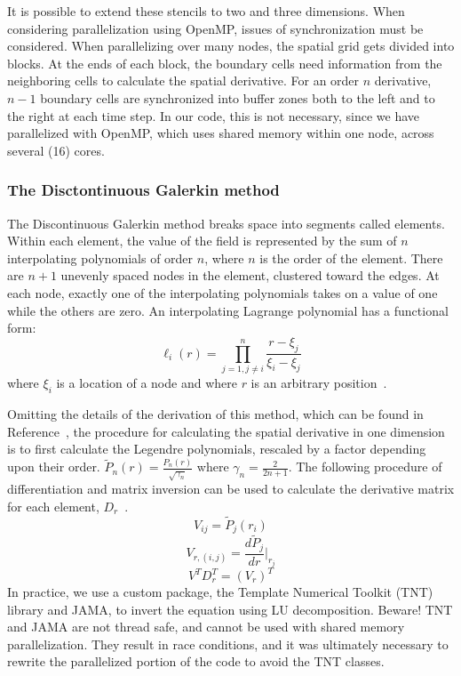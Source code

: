 It is possible to extend these stencils to two and three dimensions. When considering parallelization using OpenMP, issues of synchronization must be considered. When parallelizing over many nodes, the spatial grid gets divided into blocks. At the ends of each block, the boundary cells need information from the neighboring cells to calculate the spatial derivative. For an order $n$ derivative, $n-1$ boundary cells are synchronized into buffer zones both to the left and to the right at each time step. In our code, this is not necessary, since we have parallelized with OpenMP, which uses shared memory within one node, across several (16) cores.

\subsubsection{The Disctontinuous Galerkin method}
The Discontinuous Galerkin method breaks space into segments called elements. Within each element, the value of the field is represented by the sum of $n$ interpolating polynomials of order $n$, where $n$ is the order of the element. There are $n+1$ unevenly spaced nodes in the element, clustered toward the edges. At each node, exactly one of the interpolating polynomials takes on a value of one while the others are zero. An interpolating Lagrange polynomial has a functional form:
\begin{equation}
  \ell_i(r)=\prod_{j=1,j\ne i}^{n}\frac{r-\xi_j}{\xi_i-\xi_j}
\end{equation}
where $\xi_i$ is a location of a node and where $r$ is an arbitrary position~\cite{dghesthaven}. 


Omitting the details of the derivation of this method, which can be found in Reference~\cite{dghesthaven}, the procedure for calculating the spatial derivative in one dimension is to first calculate the Legendre polynomials, rescaled by a factor depending upon their order. $\tilde{P}_n(r)=\frac{P_n(r)}{\sqrt{\gamma_n}}$ where $\gamma_n=\frac{2}{2n+1}$. The following procedure of differentiation and matrix inversion can be used to calculate the derivative matrix for each element, $D_r$~\cite{dghesthaven}.
\begin{equation}
  V_{ij}=\tilde{P}_j(r_i)
\end{equation}
\begin{equation}
  V_{r,(i,j)}=\frac{d\tilde{P}_j}{dr}|_{r_j}
\end{equation}
\begin{equation}
  V^TD_r^T=(V_r)^T
\end{equation}
In practice, we use a custom package, the Template Numerical Toolkit (TNT) library and JAMA, to invert the equation using LU decomposition. Beware! TNT and JAMA are not thread safe, and cannot be used with shared memory parallelization. They result in race conditions, and it was ultimately necessary to rewrite the parallelized portion of the code to avoid the TNT classes.

